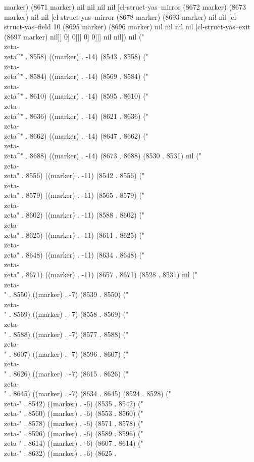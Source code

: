 {{marker) (8671 marker) nil nil nil nil [cl-struct-yas--mirror (8672 marker) (8673 marker) nil nil [cl-struct-yas--mirror (8678 marker) (8693 marker) nil nil [cl-struct-yas--field 10 (8695 marker) (8696 marker) nil nil nil nil [cl-struct-yas--exit (8697 marker) nil]] 0] 0]]] 0] 0]]] nil nil]) nil ("\\zeta-\\zeta^{}" . 8558) ((marker) . -14) (8543 . 8558) ("\\zeta-\\zeta^{}" . 8584) ((marker) . -14) (8569 . 8584) ("\\zeta-\\zeta^{}" . 8610) ((marker) . -14) (8595 . 8610) ("\\zeta-\\zeta^{}" . 8636) ((marker) . -14) (8621 . 8636) ("\\zeta-\\zeta^{}" . 8662) ((marker) . -14) (8647 . 8662) ("\\zeta-\\zeta^{}" . 8688) ((marker) . -14) (8673 . 8688) (8530 . 8531) nil ("\\zeta-\\zeta" . 8556) ((marker) . -11) (8542 . 8556) ("\\zeta-\\zeta" . 8579) ((marker) . -11) (8565 . 8579) ("\\zeta-\\zeta" . 8602) ((marker) . -11) (8588 . 8602) ("\\zeta-\\zeta" . 8625) ((marker) . -11) (8611 . 8625) ("\\zeta-\\zeta" . 8648) ((marker) . -11) (8634 . 8648) ("\\zeta-\\zeta" . 8671) ((marker) . -11) (8657 . 8671) (8528 . 8531) nil ("\\zeta-\\" . 8550) ((marker) . -7) (8539 . 8550) ("\\zeta-\\" . 8569) ((marker) . -7) (8558 . 8569) ("\\zeta-\\" . 8588) ((marker) . -7) (8577 . 8588) ("\\zeta-\\" . 8607) ((marker) . -7) (8596 . 8607) ("\\zeta-\\" . 8626) ((marker) . -7) (8615 . 8626) ("\\zeta-\\" . 8645) ((marker) . -7) (8634 . 8645) (8524 . 8528) ("\\zeta-" . 8542) ((marker) . -6) (8535 . 8542) ("\\zeta-" . 8560) ((marker) . -6) (8553 . 8560) ("\\zeta-" . 8578) ((marker) . -6) (8571 . 8578) ("\\zeta-" . 8596) ((marker) . -6) (8589 . 8596) ("\\zeta-" . 8614) ((marker) . -6) (8607 . 8614) ("\\zeta-" . 8632) ((marker) . -6) (8625 . }}
